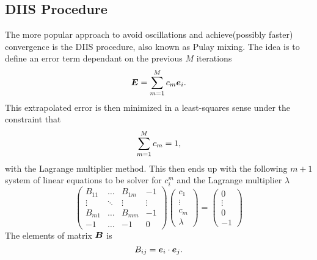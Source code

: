 \subsection{DIIS Procedure}
    The more popular approach to avoid oscillations and achieve(possibly
    faster) convergence is the DIIS procedure, also known as Pulay
    mixing\cite{PULAY,PULAY2}. The idea is to define an 
    error term dependant on the previous $M$ iterations
        \begin{equation}
            \blds{E} = \suml{m=1}{M} c_m\blds{e}_i.
            \label{eq:errorDIISdef}
        \end{equation}
    This extrapolated error is then minimized in a least-squares sense under
    the constraint that
        \begin{equation}
            \suml{m=1}{M} c_m = 1,
        \end{equation}
    with the Lagrange multiplier method. This then ends up with the following
    $m+1$ system of linear equations to be solver for ${c}^{m}_i$ and the
    Lagrange multiplier $\lambda$
        \begin{equation}
            \begin{pmatrix}
                B_{11} & \dots & B_{1m} & -1 \\
                \vdots & \ddots & \vdots & \vdots \\
                B_{m1} & \dots & B_{mm} & -1 \\
                -1 & \dots & -1 & 0
            \end{pmatrix}
            \begin{pmatrix}
                c_1 \\
                \vdots \\
                c_m \\
                \lambda
            \end{pmatrix}
            =
            \begin{pmatrix}
                0 \\
                \vdots \\
                0 \\
                -1
            \end{pmatrix}
        \end{equation}
    The elements of matrix $\blds{B}$ is
        \begin{equation}
            B_{ij} = \blds{e}_i \cdot \blds{e}_j.
        \end{equation}
